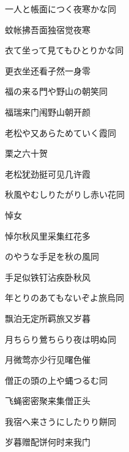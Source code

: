 \begin{haiku}
    {\FH 一人と帳面につく夜寒かな}\hfill{\FH 同}

    {\FK 蚊帐拂吾面独宿觉夜寒}
\end{haiku}

\begin{haiku}
    {\FH 衣て坐って見てもひとりかな}\hfill{\FH 同}

    {\FK 更衣坐还看孑然一身零}
\end{haiku}

\begin{haiku}
    {\FH 福の来る門や野山の朝笑}\hfill{\FH 同}

    {\FK 福瑞来门闱野山朝开颜}
\end{haiku}

\begin{haiku}
    {\FH 老松や又あらためていく霞}\hfill{\FH 同}

    {\FK 栗之六十贺}

    {\FK 老松犹劲挺可见几许霞}
\end{haiku}

\begin{haiku}
    {\FH 秋風やむしりたがりし赤い花}\hfill{\FH 同}

    {\FK 悼女}

    {\FK 悼尔秋风里采集红花多}
\end{haiku}

\begin{haiku}
    {\FH {}のやうな手足を秋の風}\hfill{\FH 同}

    {\FK 手足似铁钉沾疾卧秋风}
\end{haiku}

\begin{haiku}
    {\FH 年とりのあてもないぞよ旅烏}\hfill{\FH 同}

    {\FK 飘泊无定所羁旅又岁暮}
\end{haiku}

\begin{haiku}
    {\FH 月ちらり鶯ちらり夜は明ぬ}\hfill{\FH 同}

    {\FK 月微莺亦少行见曙色催}
\end{haiku}

\begin{haiku}
    {\FH 僧正の頭の上や蝿つるむ}\hfill{\FH 同}

    {\FK 飞蝇密密聚来集僧正头}
\end{haiku}

\begin{haiku}
    {\FH 我宿へ来さうにしたりり餅}\hfill{\FH 同}

    {\FK 岁暮赠配饼何时来我门}
\end{haiku}

